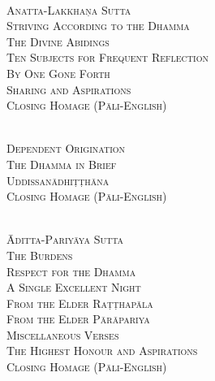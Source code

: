 {  %

  {\libertinusFont\selectfont\textbf{\textsc{}}}\\

  \textsc{
    Anatta-Lakkhaṇa Sutta \pageref{anatta-lakkhana}\\
    Striving According to the Dhamma \pageref{striving-according-to-dhamma}\\
    The Divine Abidings \pageref{divine-abidings}\\
    Ten Subjects for Frequent Reflection\\ By One Gone Forth \pageref{ten-recollections}\\
    Sharing and Aspirations \pageref{sharing-aspirations}\\
    Closing Homage (Pāli-English) \pageref{closing-homage}}\\


  {\libertinusFont\selectfont\textbf{\textsc{}}}\\

  \textsc{
    Dependent Origination \pageref{dependent-origination}\\
    The Dhamma in Brief \pageref{dhamma-in-brief}\\
    Uddissanādhiṭṭhāna \pageref{uddissanadhitthana}\\
    Closing Homage (Pāli-English) \pageref{closing-homage}}\\


  {\libertinusFont\selectfont\textbf{\textsc{}}}\\

  \textsc{
    Āditta-Pariyāya Sutta \pageref{aditta-pariyaya}\\
    The Burdens \pageref{burdens}\\
    Respect for the Dhamma \pageref{respect-for-the-dhamma}\\
    A Single Excellent Night \pageref{single-excellent-night}\\
    From the Elder Raṭṭhapāla \pageref{ratthapala}\\
    From the Elder Pārāpariya \pageref{parapariya}\\
    Miscellaneous Verses \pageref{misc-verses}\\
    The Highest Honour and Aspirations \pageref{highest-honour-aspirations}\\
    Closing Homage (Pāli-English) \pageref{closing-homage}}\\

}
